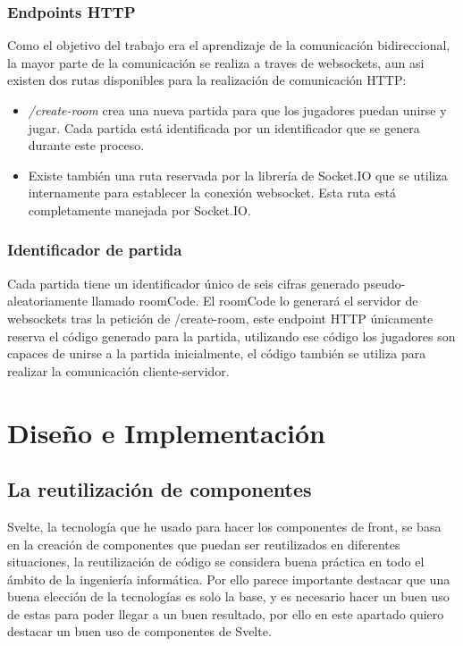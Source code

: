 \subsubsection{Endpoints HTTP}
Como el objetivo del trabajo era el aprendizaje de la comunicación bidireccional, la mayor parte de la comunicación se realiza a traves de websockets, aun asi existen dos rutas disponibles para la realización de comunicación HTTP:

\begin{itemize}
	\item \textit{/create-room} crea una nueva partida para que los jugadores puedan unirse y jugar. Cada partida está identificada por un identificador que se genera durante este proceso.
	\item Existe también una ruta reservada por la librería de Socket.IO que se utiliza internamente para establecer la conexión websocket. Esta ruta está completamente manejada por Socket.IO.
\end{itemize}

\subsubsection{Identificador de partida}
Cada partida tiene un identificador único de seis cifras generado pseudo-aleatoriamente llamado roomCode. El roomCode lo generará el servidor de websockets tras la petición de /create-room, este endpoint HTTP únicamente reserva el código generado para la partida, utilizando ese código los jugadores son capaces de unirse a la partida inicialmente, el código también se utiliza para realizar la comunicación cliente-servidor.


\section{Diseño e Implementación}

\subsection{La reutilización de componentes}
Svelte, la tecnología que he usado para hacer los componentes de front, se basa en la creación de componentes que puedan ser reutilizados en diferentes situaciones, la reutilización de código se considera buena práctica en todo el ámbito de la ingeniería informática. Por ello parece importante destacar que una buena elección de la tecnologías es solo la base, y es necesario hacer un buen uso de estas para poder llegar a un buen resultado, por ello en este apartado quiero destacar un buen uso de componentes de Svelte.

